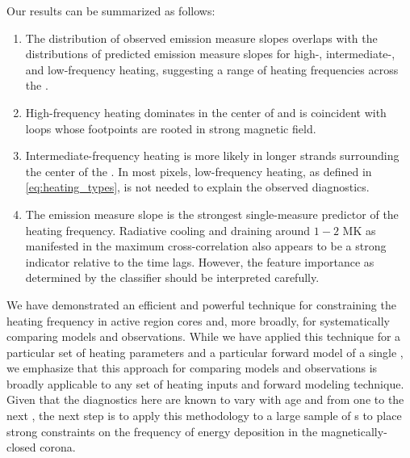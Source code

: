 Our results can be summarized as follows:
\begin{enumerate}
    \item The distribution of observed emission measure slopes overlaps with the distributions of predicted emission measure slopes for high-, intermediate-, and low-frequency heating, suggesting a range of heating frequencies across the \AR{}.
    \item High-frequency heating dominates in the center of \AR{} and is coincident with loops whose footpoints are rooted in strong magnetic field.
    \item Intermediate-frequency heating is more likely in longer strands surrounding the center of the \AR{}. In most pixels, low-frequency heating, as defined in \autoref{eq:heating_types}, is not needed to explain the observed diagnostics.
    \item The emission measure slope is the strongest single-measure predictor of the heating frequency. Radiative cooling and draining around $1-2$ MK as manifested in the maximum cross-correlation also appears to be a strong indicator relative to the time lags. However, the feature importance as determined by the classifier should be interpreted carefully.
\end{enumerate}

We have demonstrated an efficient and powerful technique for constraining the heating frequency in active region cores and, more broadly, for systematically comparing models and observations.
While we have applied this technique for a particular set of heating parameters and a particular forward model of a single \AR{}, we emphasize that this approach for comparing models and observations is broadly applicable to any set of heating inputs and forward modeling technique. 
Given that the diagnostics here are known to vary with age \citep[e.g.][]{schmelz_cold_2012,del_zanna_evolution_2015} and from one \AR{} to the next \citep{warren_systematic_2012,viall_survey_2017}, the next step is to apply this methodology to a large sample of \AR s to place strong constraints on the frequency of energy deposition in the magnetically-closed corona.
